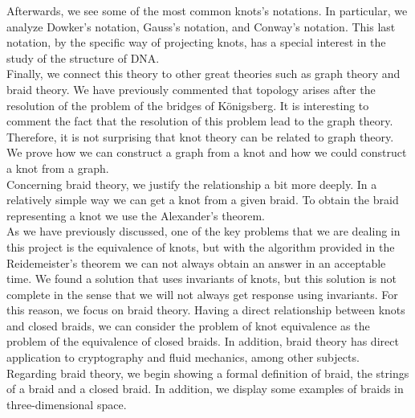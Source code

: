 Afterwards, we see some of the most common knots’s notations. In particular, we analyze Dowker's notation, Gauss's notation, and Conway's notation. This last notation, by the specific way of projecting knots, has a special interest in the study of the structure of DNA.\\


Finally, we connect this theory to other great theories such as graph theory and braid theory. We have previously commented that topology arises after the resolution of the problem of the bridges of Königsberg. It is interesting to comment the fact that the resolution of this problem lead to the graph theory. Therefore, it is not surprising that knot theory can be related to graph theory. We prove how we can construct a graph from a knot and how we could construct a knot from a graph.\\


Concerning braid theory, we justify the relationship a bit more deeply. In a relatively simple way we can get a knot from a given braid. To obtain the braid representing a knot we use the Alexander's theorem.\\








As we have previously discussed, one of the key problems that we are dealing in this project is the equivalence of knots, but with the algorithm provided in the Reidemeister's theorem we can not always obtain an answer in an acceptable time. We found a solution that uses invariants of knots, but this solution is not complete in the sense that we will not always get response using invariants. For this reason, we focus on braid theory. Having a direct relationship between knots and closed braids, we can consider the problem of knot equivalence as the problem of the equivalence of closed braids. In addition, braid theory has direct application to cryptography and fluid mechanics, among other subjects.\\








Regarding braid theory, we begin showing a formal definition of braid, the strings of a braid and a closed braid. In addition, we display some examples of braids in three-dimensional space.\\


